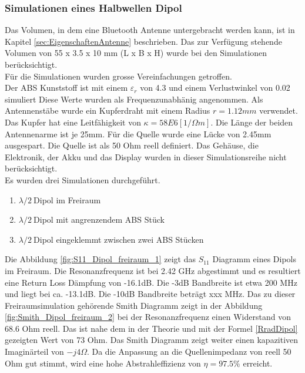 \newpage
\subsubsection{Simulationen eines Halbwellen Dipol}

Das Volumen, in dem eine Bluetooth Antenne untergebracht werden kann, ist in Kapitel \ref{sec:EigenschaftenAntenne} beschrieben. Das zur Verfügung stehende Volumen von 55 x 3.5 x 10 mm (L x B x H) wurde bei den Simulationen berücksichtigt. \\
Für die Simulationen wurden grosse Vereinfachungen getroffen.\\
Der ABS Kunststoff ist mit einem $\varepsilon_r $ von 4.3 und einem Verlustwinkel von 0.02 simuliert Diese Werte wurden als Frequenzunabhänig angenommen. Als Antennenstäbe wurde ein  Kupferdraht mit einem Radius $r = 1.12 mm$ verwendet. Das Kupfer hat eine Leitfähigkeit von $\kappa=58E6 [1/\Omega m]$. Die Länge der beiden Antennenarme ist je 25mm. Für die Quelle wurde eine Lücke von 2.45mm ausgespart. Die Quelle ist als 50 Ohm reell definiert. Das Gehäuse, die Elektronik, der Akku und das Display wurden in dieser Simulationsreihe nicht berücksichtigt.\\ 
Es wurden drei Simulationen durchgeführt.
\begin{enumerate}
\item  $\lambda/2 \ $Dipol im Freiraum
\item  $\lambda/2 \ $Dipol mit angrenzendem ABS Stück
\item  $\lambda/2 \ $Dipol eingeklemmt zwischen zwei ABS Stücken
\end{enumerate}

Die Abbildung \ref{fig:S11_Dipol_freiraum_1} zeigt das $S_{11}$ Diagramm eines Dipols im Freiraum. Die Resonanzfrequenz ist bei 2.42 GHz abgestimmt und es resultiert eine Return Loss Dämpfung von -16.1dB. Die -3dB Bandbreite ist etwa 200 MHz und liegt bei ca. -13.1dB. Die -10dB Bandbreite beträgt xxx MHz. Das zu dieser Freiraumsimulation gehörende Smith Diagramm zeigt in der Abbildung \ref{fig:Smith_Dipol_freiraum_2}  bei der Resonanzfrequenz einen Widerstand von 68.6 Ohm reell. Das ist nahe dem in der Theorie und mit der Formel \ref{RradDipol} gezeigten Wert von 73 Ohm. Das Smith Diagramm zeigt weiter einen kapazitiven  Imaginärteil von $-j4\Omega$. Da die Anpassung an die Quellenimpedanz von reell 50 Ohm gut stimmt, wird eine hohe Abstrahleffizienz von $\eta = 97.5 \% $ erreicht.


